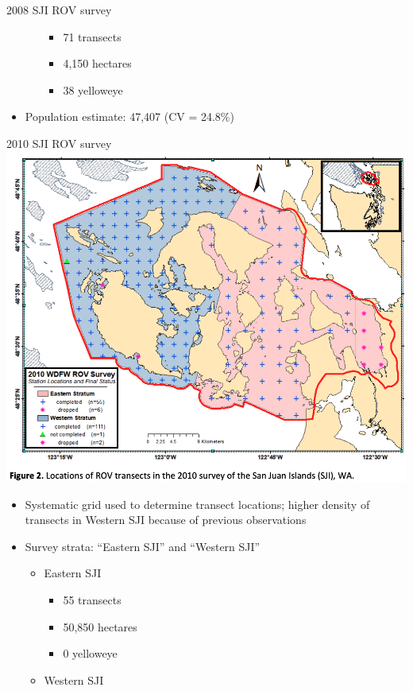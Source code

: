 \documentclass[
  ignorenonframetext,
]{beamer}
\providecommand{\tightlist}{%
  \setlength{\itemsep}{0pt}\setlength{\parskip}{0pt}}
\begin{document}
\begin{frame}{2008 SJI ROV survey}
\begin{itemize}
\begin{itemize}
    \begin{itemize}
    \tightlist
    \item
      71 transects
    \item
      4,150 hectares
    \item
      38 yelloweye
    \end{itemize}
  \end{itemize}
\item
  Population estimate: 47,407 (CV = 24.8\%)
\end{itemize}
\end{frame}

\begin{frame}{2010 SJI ROV survey}
\protect\hypertarget{sji-rov-survey-1}{}
\includegraphics[width=1\textwidth,height=\textheight]{2010_SJI_map.png}

\begin{itemize}
\tightlist
\item
  Systematic grid used to determine transect locations; higher density
  of transects in Western SJI because of previous observations
\item
  Survey strata: ``Eastern SJI'' and ``Western SJI''

  \begin{itemize}
  \tightlist
  \item
    Eastern SJI

    \begin{itemize}
    \tightlist
    \item
      55 transects
    \item
      50,850 hectares
    \item
      0 yelloweye
    \end{itemize}
  \item
    Western SJI


\end{itemize}
\end{itemize}
\end{frame}
\end{document}
